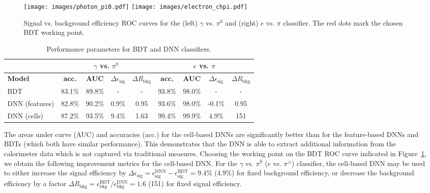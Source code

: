 \begin{figure}[!t]
    \centering
    \texttt{[image: images/photon\_pi0.pdf]}
    \texttt{[image: images/electron\_chpi.pdf]}
    \caption{Signal vs. background efficiency ROC curves for the (left) $\gamma$ vs. $\pi^0$ and (right) $e$ vs. $\pi$ classifier. The red dots mark the chosen BDT working point.}
    \label{ROCs}
\end{figure}

\begin{table}[!ht]
    \centering
    \begin{tabular}[!t]{l|cccc|cccc}
        \hline
        & \multicolumn{4}{c}{\textbf{$\gamma$ vs. $\pi^0$}} & \multicolumn{4}{c}{\textbf{$e$ vs. $\pi$}}\\
        \hline
        \textbf{Model} & \textbf{acc.} &  \textbf{AUC} & \textbf{$\Delta \epsilon_{\mathrm{sig}}$} & \textbf{$\Delta R_{\mathrm{bkg}}$} & \textbf{acc.} &  \textbf{AUC} & \textbf{$\Delta \epsilon_{\mathrm{sig}}$} & \textbf{$\Delta R_{\mathrm{bkg}}$} \\
        \hline
        \centering
        BDT & 83.1\% & 89.8\% & - & - & 93.8\% & 98.0\% & - & - \\
        DNN (features) & 82.8\% & 90.2\% & 0.9\% & 0.95 & 93.6\% & 98.0\% & -0.1\% & 0.95 \\
        DNN (cells) & 87.2\% & 93.5\% & 9.4\% & 1.63 & 99.4\% & 99.9\% & 4.9\% & 151 \\
        \hline
        \hline
    \end{tabular}
    \vspace{5pt}
    \caption{Performance parameters for BDT and DNN classifiers.} 
    \label{AUCs}
\end{table}

The areas under curve (AUC) and accuracies (acc.) for the cell-based DNNs are significantly better than for the feature-based DNNs and BDTs (which both have similar performance). This demonstrates that the DNN is able to extract additional information from the calorimeter data which is not captured via traditional measures. Choosing the working point on the BDT ROC curve indicated in Figure~\ref{ROCs}, we obtain the following improvement metrics for the cell-based DNN. For the $\gamma$ vs. $\pi^0$ ($e$ vs. $\pi^\pm$) classifier, the cell-based DNN may be used to either increase the signal efficiency by $\Delta \epsilon_{\mathrm{sig}} = \epsilon_{\mathrm{sig}}^{\mathrm{DNN}} - \epsilon_{\mathrm{sig}}^{\mathrm{BDT}}=9.4$\% (4.9\%) for fixed background efficiency, or decrease the background efficiency by a factor $\Delta R_{\mathrm{bkg}} = \epsilon_{\mathrm{bkg}}^{\mathrm{BDT}} / \epsilon_{\mathrm{bkg}}^{\mathrm{DNN}}= 1.6$ (151) for fixed signal efficiency.

